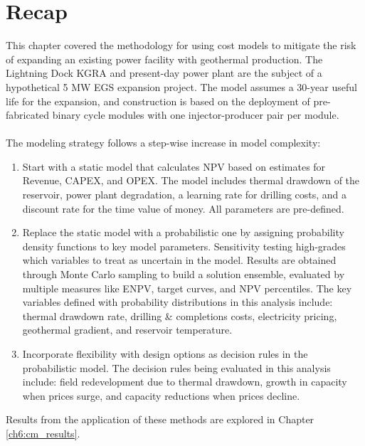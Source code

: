 \section{Recap} \label{ch4:recap}
This chapter covered the methodology for using cost models to mitigate the risk of expanding an existing power facility with geothermal production. The Lightning Dock KGRA and present-day power plant are the subject of a hypothetical 5 MW EGS expansion project. The model assumes a 30-year useful life for the expansion, and construction is based on the deployment of pre-fabricated binary cycle modules with one injector-producer pair per module.
\\
\\
The modeling strategy follows a step-wise increase in model complexity:
\begin{enumerate}
    \item Start with a static model that calculates NPV based on estimates for Revenue, CAPEX, and OPEX. The model includes thermal drawdown of the reservoir, power plant degradation, a learning rate for drilling costs, and a discount rate for the time value of money. All parameters are pre-defined.
    \item Replace the static model with a probabilistic one by assigning probability density functions to key model parameters. Sensitivity testing high-grades which variables to treat as uncertain in the model. Results are obtained through Monte Carlo sampling to build a solution ensemble, evaluated by multiple measures like ENPV, target curves, and NPV percentiles. The key variables defined with probability distributions in this analysis include: thermal drawdown rate, drilling \& completions costs, electricity pricing, geothermal gradient, and reservoir temperature.
    \item Incorporate flexibility with design options as decision rules in the probabilistic model. The decision rules being evaluated in this analysis include: field redevelopment due to thermal drawdown, growth in capacity when prices surge, and capacity reductions when prices decline.
\end{enumerate}

Results from the application of these methods are explored in Chapter \ref{ch6:cm_results}. 